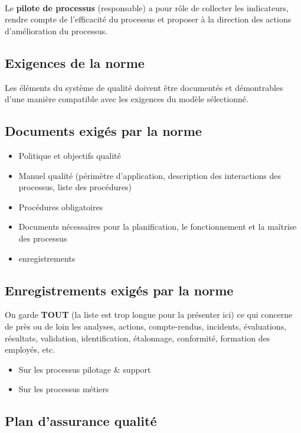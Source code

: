 \hfill\\

Le \textbf{pilote de processus} (responsable) a pour rôle de collecter les indicateurs, rendre compte de l’efficacité du processus et proposer à la direction des actions d’amélioration du processus.


\subsection{Exigences de la norme}

Les éléments du système de qualité doivent être documentés et démontrables d’une manière compatible avec les exigences du modèle sélectionné.

\subsection{Documents exigés par la norme}
\begin{itemize}
	\item Politique et objectifs qualité
	\item Manuel qualité (périmètre d'application, description des interactions des processus, liste des procédures)
	\item Procédures obligatoires
	\item Documents nécessaires pour la planification, le fonctionnement et la maîtrise des processus
	\item enregistrements
\end{itemize}

\subsection{Enregistrements exigés par la norme}
On garde \textbf{TOUT} (la liste est trop longue pour la présenter ici) ce qui concerne de près ou de loin les analyses, actions, compte-rendus, incidents, évaluations, résultats, validation, identification, étalonnage, conformité, formation des employés, etc.

\begin{itemize}
	\item Sur les processus pilotage \& support
	\item Sur les processus métiers
\end{itemize}

\subsection{Plan d’assurance qualité}

